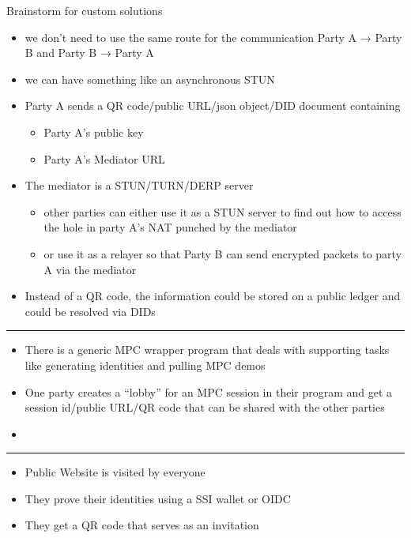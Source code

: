 \begin{frame}{Brainstorm for custom solutions}
\begin{itemize}
\tightlist
\item
  we don't need to use the same route for the communication Party A → Party B and Party B → Party A
\item
  we can have something like an asynchronous STUN
\item
  Party A sends a QR code/public URL/json object/DID document containing

  \begin{itemize}
  \tightlist
  \item
    Party A's public key
  \item
    Party A's Mediator URL
  \end{itemize}
\item
  The mediator is a STUN/TURN/DERP server

  \begin{itemize}
  \tightlist
  \item
    other parties can either use it as a STUN server to find out how to access the hole in party A's NAT punched by the mediator
  \item
    or use it as a relayer so that Party B can send encrypted packets to party A via the mediator
  \end{itemize}
\item
  Instead of a QR code, the information could be stored on a public ledger and could be resolved via DIDs
\end{itemize}

\begin{center}\rule{0.5\linewidth}{0.5pt}\end{center}

\begin{itemize}
\tightlist
\item
  There is a generic MPC wrapper program that deals with supporting tasks like generating identities and pulling MPC demos
\item
  One party creates a ``lobby'' for an MPC session in their program and get a session id/public URL/QR code that can be shared with the other parties
\item
\end{itemize}

\begin{center}\rule{0.5\linewidth}{0.5pt}\end{center}

\begin{itemize}
\tightlist
\item
  Public Website is visited by everyone
\item
  They prove their identities using a SSI wallet or OIDC
\item
  They get a QR code that serves as an invitation


\end{itemize}
\end{frame}
